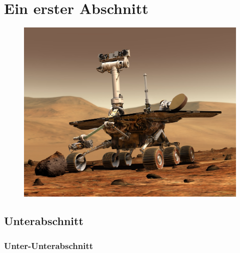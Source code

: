 










	
			
	\section{Ein erster Abschnitt}
	
	\thispagestyle{headings}	
	
	
	\blindtext[5]
	
	
	
	\markright{\@\hsmaautor: \@\shorttitle}
	\thispagestyle{headings}
	
	
	
	
	
	
	\begin{figure}[th]
		\centering
		\includegraphics[width=0.7\linewidth]{bilder/nasa_rover}
		\caption{}
		\label{fig:nasarover}
	\end{figure}
	
	\cite{Kornmeier2011}
	\blindtext[4]
	\subsection{Unterabschnitt}
	
	\blindtext[5]
	
	\subsubsection{Unter-Unterabschnitt}
	
